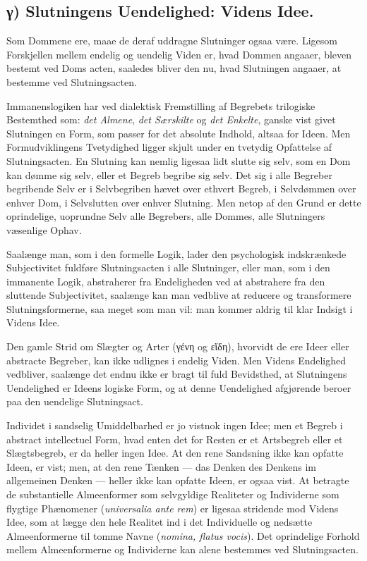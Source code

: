 \documentclass[12pt]{book}
\newcommand{\opage}[1]{\marginnote{\footnotesize\textit{[#1]}}}
\begin{document}
\subsection*{γ) Slutningens Uendelighed: Videns Idee.}

Som Dommene ere, maae de deraf uddragne Slutninger ogsaa være.
Ligesom Forskjellen mellem endelig og uendelig Viden er, hvad Dommen
angaaer, bleven bestemt ved Doms%
\opage{20}acten, saaledes bliver den nu, hvad Slutningen angaaer, at bestemme
ved Slutningsacten.

Immanenslogiken har ved dialektisk Fremstilling af Begrebets
trilogiske Bestemthed som: \emph{det Almene}, \emph{det Særskilte} og
\emph{det Enkelte}, ganske vist givet Slutningen en Form, som passer
for det absolute Indhold, altsaa for Ideen. Men Formudviklingens
Tvetydighed ligger skjult under en tvetydig Opfattelse af
Slutningsacten. En Slutning kan nemlig ligesaa lidt slutte sig selv,
som en Dom kan dømme sig selv, eller et Begreb begribe sig selv. Det
sig i alle Begreber begribende Selv er i Selvbegriben hævet over
ethvert Begreb, i Selvdømmen over enhver Dom, i Selvslutten over
enhver Slutning. Men netop af den Grund er dette oprindelige,
uoprundne Selv alle Begrebers, alle Dommes, alle Slutningers
væsenlige Ophav.

Saalænge man, som i den formelle Logik, lader den psychologisk
indskrænkede Subjectivitet fuldføre Slutningsacten i alle Slutninger,
eller man, som i den immanente Logik, abstraherer fra Endeligheden
ved at abstrahere fra den sluttende Subjectivitet, saalænge kan man
vedblive at reducere og transformere Slutningsformerne, saa meget som
man vil: man kommer aldrig til klar Indsigt i Videns Idee.

Den gamle Strid om Slægter og Arter (γένη og εἴδη), hvorvidt de ere
Ideer eller abstracte Begreber, kan ikke udlignes i endelig Viden.
Men Videns Endelighed vedbliver, saalænge det endnu ikke er bragt til
fuld Bevidsthed, at Slutningens Uendelighed er Ideens logiske Form,
og at denne Uendelighed afgjørende beroer paa den uendelige
Slutningsact.

Individet i sandselig Umiddelbarhed er jo vistnok ingen Idee; men et
Begreb i abstract intellectuel Form, hvad enten det for Resten er et
Artsbegreb eller et Slægtsbegreb, er da heller ingen Idee. At den
rene Sandsning ikke kan opfatte Ideen, er vist; men, at den rene
Tænken --- das Denken
\opage{21} des Denkens im allgemeinen Denken --- heller ikke kan opfatte Ideen,
er ogsaa vist. At betragte de substantielle Almeenformer som
selvgyldige Realiteter og Individerne som flygtige Phænomener
(\textit{universalia ante rem}) er ligesaa stridende mod Videns Idee,
som at lægge den hele Realitet ind i det Individuelle og nedsætte
Almeenformerne til tomme Navne (\textit{nomina, flatus vocis}). Det
oprindelige Forhold mellem Almeenformerne og Individerne kan alene
bestemmes ved Slutningsacten.
\end{document}
